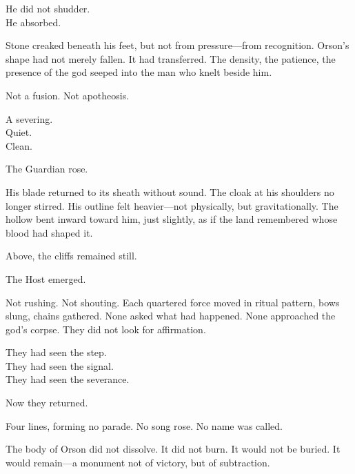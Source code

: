 \documentclass[12pt]{article}
\begin{document}
\vspace{0.5em}
He did not shudder.\\
He absorbed.

\vspace{0.5em}
Stone creaked beneath his feet, but not from pressure---from recognition. Orson’s shape had not merely fallen. It had transferred. The density, the patience, the presence of the god seeped into the man who knelt beside him.

\vspace{0.5em}
Not a fusion. Not apotheosis.

\vspace{0.5em}
A severing.\\
Quiet.\\
Clean.

\vspace{0.5em}
The Guardian rose.

\vspace{0.5em}
His blade returned to its sheath without sound. The cloak at his shoulders no longer stirred. His outline felt heavier---not physically, but gravitationally. The hollow bent inward toward him, just slightly, as if the land remembered whose blood had shaped it.

\vspace{0.5em}
Above, the cliffs remained still.

\vspace{0.5em}
The Host emerged.

\vspace{0.5em}
Not rushing. Not shouting. Each quartered force moved in ritual pattern, bows slung, chains gathered. None asked what had happened. None approached the god’s corpse. They did not look for affirmation.

\vspace{0.5em}
They had seen the step.\\
They had seen the signal.\\
They had seen the severance.

\vspace{0.5em}
Now they returned.

\vspace{0.5em}
Four lines, forming no parade. No song rose. No name was called.

\vspace{0.5em}
The body of Orson did not dissolve. It did not burn. It would not be buried. It would remain---a monument not of victory, but of subtraction.
\end{document}
